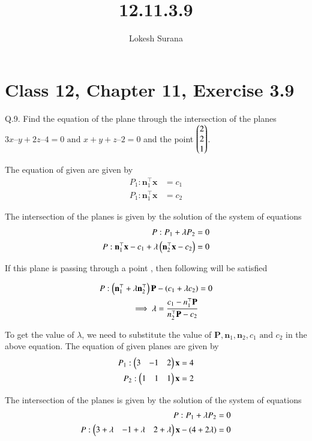 \documentclass[journal,12pt,twocolumn]{IEEEtran}
\renewcommand{\vec}[1]{\boldsymbol{\mathbf{#1}}}
\begin{document}
\vspace{3cm}
\title{12.11.3.9}
\author{Lokesh Surana}
\maketitle
\section*{Class 12, Chapter 11, Exercise 3.9}

Q.9. Find the equation of the plane through the intersection of the planes $3{x} – {y} + 2{z} – 4 = 0 \text{ and } {x} + {y} + {z} – 2 = 0$ and the point $\begin{pmatrix}2\\2\\1\end{pmatrix}$.

\solution The equation of given are given by
\begin{align}
	 {P}_1: \vec{n}_1^{\top}{\vec{x}} &= {c}_1\\
	 {P}_1: \vec{n}_1^{\top}{\vec{x}} &= {c}_2
\end{align}

The intersection of the planes is given by the solution of the system of equations
\begin{align}
    {P}: {P}_1 + \lambda {P}_2 &= 0 \\
    {P}: \vec{n}_1^{\top}{\vec{x}} - {c}_1 + \lambda\brak{\vec{n}_2^{\top}{\vec{x}} - {c}_2} &= 0
\end{align}

If this plane is passing through a point \vec{P}, then following will be satisfied

\begin{align}
	{P}: \brak{\vec{n}_1^{\top} + \lambda\vec{n}_2^{\top}}\vec{P} - \brak{{c}_1 + \lambda{c}_2} &= 0\\
    \implies \lambda = \frac{{c}_1 - {n}_1^{\top}\vec{P}}{{n}_2^{\top}\vec{P} - {c}_2} 
\end{align}

To get the value of $\lambda$, we need to substitute the value of $\vec{P}, \vec{n}_1, \vec{n}_2, {c}_1 \text{ and } {c}_2$ in the above equation.
The equation of given planes are given by
\begin{align}
    {P}_1: \myvec{3&-1&2}{\vec{x}} &= 4\\
    {P}_2: \myvec{1&1&1}{\vec{x}} &= 2
\end{align}

The intersection of the planes is given by the solution of the system of equations
\begin{align}
    {P}: {P}_1 + \lambda {P}_2 &= 0 \\
    {P}: \myvec{3+\lambda&-1+\lambda&2+\lambda}{\vec{x}} - {(4 + 2\lambda)} &= 0
\end{align}
\end{document}
